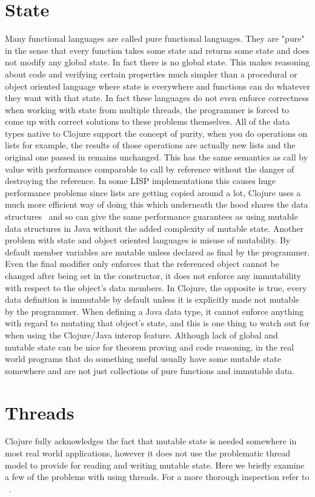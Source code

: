 \section{State}
Many functional languages are called pure functional languages. They are "pure" in the sense that every function takes some state and returns some state and does not modify any global state. In fact there is no global state. This makes reasoning about code and verifying certain properties much simpler than a procedural or object oriented language where state is everywhere and functions can do whatever they want with that state\cite{process}. In fact these languages do not even enforce correctness when working with state from multiple threads, the programmer is forced to come up with correct solutions to these problems themselves. All of the data types native to Clojure support the concept of purity, when you do operations on lists for example, the results of those operations are actually new lists and the original one passed in remains unchanged. This has the same semantics as call by value with performance comparable to call by reference without the danger of destroying the reference. In some LISP implementations this causes huge performance problems since lists are getting copied around a lot, Clojure uses a much more efficient way of doing this which underneath the hood shares the data structures~\cite{cljDataStructures} and so can give the same performance guarantees as using mutable data structures in Java without the added complexity of mutable state. Another problem with state and object oriented languages is misuse of mutability. By default member variables are mutable unless declared as final by the programmer. Even the final modifier only enforces that the referenced object cannot be changed after being set in the constructor, it does not enforce any immutability with respect to the object's data members. In Clojure, the opposite is true, every data definition is immutable by default unless it is explicitly made not mutable by the programmer. When defining a Java data type, it cannot enforce anything with regard to mutating that object's state, and this is one thing to watch out for when using the Clojure/Java interop feature. Although lack of global and mutable state can be nice for theorem proving and code reasoning, in the real world programs that do something useful usually have some mutable state somewhere and are not just collections of pure functions and immutable data.  

\section{Threads}
Clojure fully acknowledges the fact that mutable state is needed somewhere in most real world applications, however it does not use the problematic thread model to provide for reading and writing mutable state. Here we briefly examine a few of the problems with using threads. For a more thorough inspection refer to ~\cite{1076522}.

